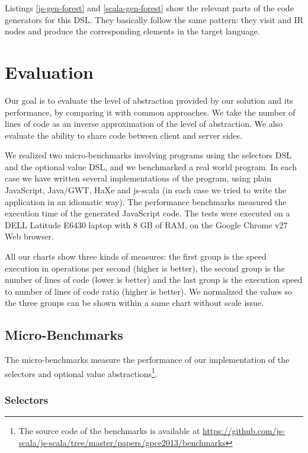 \documentclass[preprint]{sigplanconf}
\begin{document}
Listings \ref{js-gen-forest} and \ref{scala-gen-forest} show the relevant parts of the code
generators for this DSL. They basically follow the same pattern: they visit  and
 IR nodes and produce the corresponding elements in the target language.


\section{Evaluation}
\label{sec:validation}

Our goal is to evaluate the level of abstraction provided by our solution and its performance, by
comparing it with common approaches. We take the number of lines of code as an inverse approximation
of the level of abstraction. We also evaluate the ability to share code between client and server
sides.

We realized two micro-benchmarks involving programs using the selectors DSL and the
optional value DSL, and we benchmarked a real world program. In each case we have written several
implementations of the program, using plain JavaScript, Java/GWT, HaXe and js-scala (in each case we
tried to write the application in an idiomatic way). The performance benchmarks measured the
execution time of the generated JavaScript code. The tests were executed on a DELL Latitude E6430
laptop with 8 GB of RAM, on the Google Chrome v27 Web browser.

All our charts show three kinds of measures: the first group is the speed execution in operations
per second (higher is better), the second group is the number of lines of code (lower is better) and
the last group is the execution speed to number of lines of code ratio (higher is better). We
normalized the values so the three groups can be shown within a same chart without scale issue.

\subsection{Micro-Benchmarks}

The micro-benchmarks measure the performance of our implementation of the selectors and optional
value abstractions\footnote{The source code of the benchmarks is available at
\href{https://github.com/js-scala/js-scala/tree/master/papers/gpce2013/benchmarks}{
https://github.com/js-scala/js-scala/tree/master/papers/gpce2013/benchmarks}}.

\subsubsection{Selectors}
\end{document}
